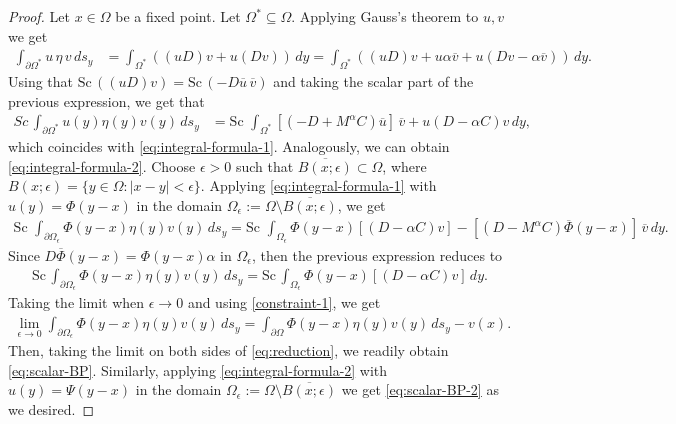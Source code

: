 \documentclass[12pt]{article}
\def\Sc{\mbox{Sc}\,}
\begin{document}
\begin{proof}
Let $x\in \Omega$ be a fixed point. Let $\Omega^*\subseteq \Omega$. Applying Gauss's theorem to $u, v$ \cite[Th.\ A.2.22]{GuHaSpr2008} we get
\begin{align*}
\int_{\partial\Omega^*} u\,\eta \, v\, ds_y&=\int_{\Omega^*} \left((uD)v+u(Dv)\right)\, dy =\int_{\Omega^*} \left((uD)v+u\alpha\overline{v}+u(Dv-\alpha \overline{v})\right)\, dy.
\end{align*}
Using that $\Sc((uD)v)=\Sc(-D\overline{u}\,\overline{v})$ and taking the scalar part of the previous expression, we get that
\begin{align*}
Sc \, \int_{\partial\Omega^*} u(y)\eta(y) v(y)\, ds_y&=\Sc\, \int_{\Omega^*} [(-D+M^{\alpha}C)\overline{u}]\, \overline{v}+u(D-\alpha C)v \, dy,
\end{align*}
which coincides with \eqref{eq:integral-formula-1}. Analogously, we can obtain \eqref{eq:integral-formula-2}.
Choose $\epsilon>0$ such that $\overline{B(x;\epsilon)}\subset \Omega$, where $B(x;\epsilon)=\{y\in \Omega \colon  |x-y|<\epsilon\}$. Applying \eqref{eq:integral-formula-1} with $u(y)=\Phi(y-x)$ in the domain $\Omega_{\epsilon}:=\Omega\setminus \overline{B(x;\epsilon)}$, we get
\begin{align*}
\Sc \, \int_{\partial\Omega_{\epsilon}}\Phi(y-x) \eta(y) v(y)\, ds_{y}=\Sc \, \int_{\Omega_{\epsilon}} \Phi(y-x) [ (D-\alpha C)v]-
   [(D-M^{\alpha}C)\overline{\Phi}(y-x)]\, \overline{v} \, dy.
\end{align*}
Since $D\overline{\Phi}(y-x)=\Phi(y-x) \alpha$ in $\Omega_{\epsilon}$, then the previous expression reduces to
\begin{align}\label{eq:reduction}
\Sc \int_{\partial\Omega_{\epsilon}}\Phi(y-x) \eta(y) v(y)\, ds_{y}=\Sc \int_{\Omega_{\epsilon}} \Phi(y-x) [ (D-\alpha C)v] \, dy.
\end{align}
Taking the limit when $\epsilon\rightarrow 0$ and using \eqref{constraint-1}, we get
\begin{align*}
\lim_{\epsilon \rightarrow 0}\int_{\partial\Omega_{\epsilon}}\Phi(y-x) \eta(y) v(y)\, ds_y=\int_{\partial\Omega}\Phi(y-x) \eta(y) v(y)\, ds_y-v(x).
\end{align*}
Then, taking the limit on both sides of \eqref{eq:reduction}, we readily obtain \eqref{eq:scalar-BP}. Similarly, applying \eqref{eq:integral-formula-2} with $u(y)=\Psi(y-x)$ in the domain $\Omega_{\epsilon}:=\Omega\setminus \overline{B(x;\epsilon)}$ we get \eqref{eq:scalar-BP-2} as we desired.
\end{proof}
\end{document}
